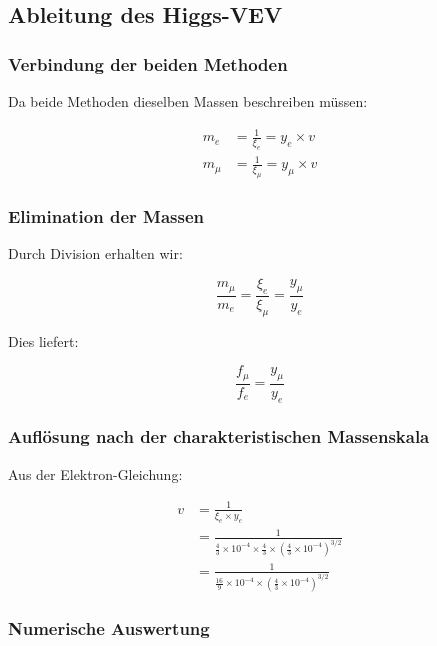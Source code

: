 \subsection{Ableitung des Higgs-VEV}

\subsubsection{Verbindung der beiden Methoden}

Da beide Methoden dieselben Massen beschreiben müssen:

\begin{align}
	m_e &= \frac{1}{\xi_e} = y_e \times v\\
	m_\mu &= \frac{1}{\xi_\mu} = y_\mu \times v
\end{align}

\subsubsection{Elimination der Massen}

Durch Division erhalten wir:

\begin{equation}
	\frac{m_\mu}{m_e} = \frac{\xi_e}{\xi_\mu} = \frac{y_\mu}{y_e}
\end{equation}

Dies liefert:

\begin{equation}
	\frac{f_\mu}{f_e} = \frac{y_\mu}{y_e}
\end{equation}

\subsubsection{Auflösung nach der charakteristischen Massenskala}

Aus der Elektron-Gleichung:

\begin{align}
	v &= \frac{1}{\xi_e \times y_e}\\
	&= \frac{1}{\frac{4}{3} \times 10^{-4} \times \frac{4}{3} \times \left(\frac{4}{3} \times 10^{-4}\right)^{3/2}}\\
	&= \frac{1}{\frac{16}{9} \times 10^{-4} \times \left(\frac{4}{3} \times 10^{-4}\right)^{3/2}}
\end{align}

\subsubsection{Numerische Auswertung}

